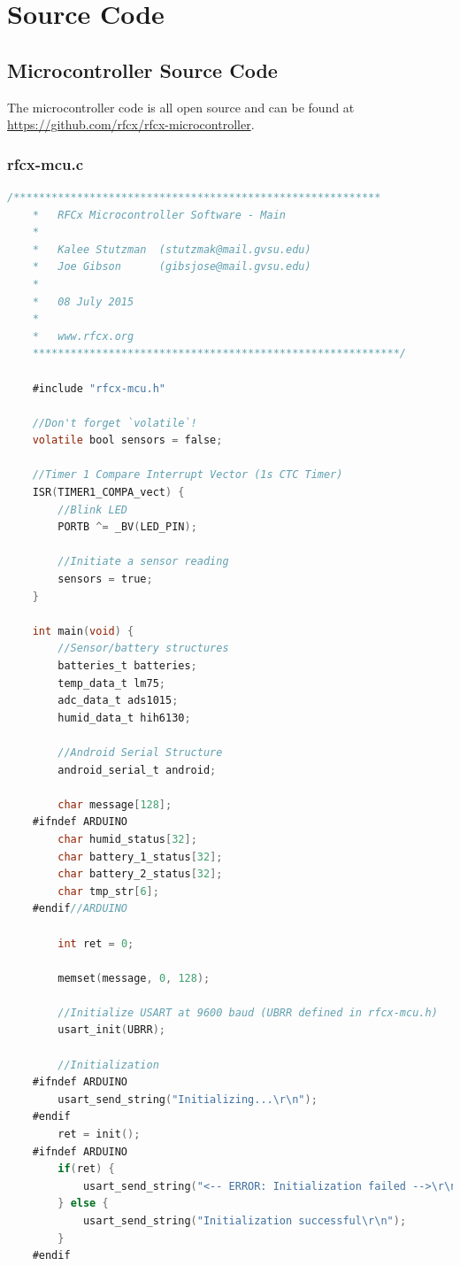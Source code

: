 \documentclass{article}
\numberwithin{figure}{section}
\numberwithin{equation}{section}
\begin{document}
{\section{Source Code} \label{sect:appendixF}
\subsection{Microcontroller Source Code}\label{sect:mcu-source}
The microcontroller code is all open source and can be found at \href{https://github.com/rfcx/rfcx-microcontroller}{https://github.com/rfcx/rfcx-microcontroller}.
\subsubsection{rfcx-mcu.c}\label{sect:rfcx-mcu.c}
\begin{lstlisting}[language=C,label=lst:rfcx-mcu.c,caption=rfcx-mcu.c]
    /**********************************************************
    *	RFCx Microcontroller Software - Main
    *
    *	Kalee Stutzman 	(stutzmak@mail.gvsu.edu)
    *	Joe Gibson		(gibsjose@mail.gvsu.edu)
    *
    *	08 July 2015
    *
    *   www.rfcx.org
    **********************************************************/

    #include "rfcx-mcu.h"

    //Don't forget `volatile`!
    volatile bool sensors = false;

    //Timer 1 Compare Interrupt Vector (1s CTC Timer)
    ISR(TIMER1_COMPA_vect) {
    	//Blink LED
    	PORTB ^= _BV(LED_PIN);

    	//Initiate a sensor reading
    	sensors = true;
    }

    int main(void) {
    	//Sensor/battery structures
    	batteries_t batteries;
    	temp_data_t lm75;
    	adc_data_t ads1015;
    	humid_data_t hih6130;

    	//Android Serial Structure
    	android_serial_t android;

    	char message[128];
    #ifndef ARDUINO
    	char humid_status[32];
    	char battery_1_status[32];
    	char battery_2_status[32];
    	char tmp_str[6];
    #endif//ARDUINO

    	int ret = 0;

    	memset(message, 0, 128);

    	//Initialize USART at 9600 baud (UBRR defined in rfcx-mcu.h)
    	usart_init(UBRR);

    	//Initialization
    #ifndef ARDUINO
    	usart_send_string("Initializing...\r\n");
    #endif
    	ret = init();
    #ifndef ARDUINO
    	if(ret) {
    		usart_send_string("<-- ERROR: Initialization failed -->\r\n");
    	} else {
    		usart_send_string("Initialization successful\r\n");
    	}
    #endif


\end{lstlisting}}
\end{document}
